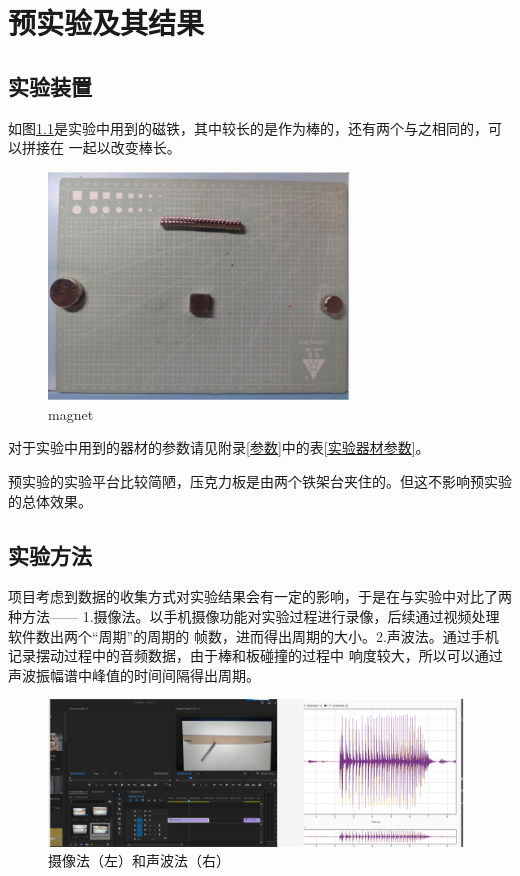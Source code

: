\documentclass[AutoFakeBold]{LZUThesis}
\begin{document}
\chapter{预实验及其结果}
\section{实验装置}
如图\ref{magnet}是实验中用到的磁铁，其中较长的是作为棒的，还有两个与之相同的，可以拼接在
一起以改变棒长。
\begin{figure}[H]
    \centering
    \includegraphics[width=8cm]{figures/magnet.png}
    \caption{magnet}
    \label{magnet}
\end{figure}

对于实验中用到的器材的参数请见附录\ref{参数}中的表\ref{实验器材参数}。

预实验的实验平台比较简陋，压克力板是由两个铁架台夹住的。但这不影响预实验的总体效果。

\section{实验方法}
项目考虑到数据的收集方式对实验结果会有一定的影响，于是在与实验中对比了两种方法——
1.摄像法。以手机摄像功能对实验过程进行录像，后续通过视频处理软件数出两个“周期”的周期的
帧数，进而得出周期的大小。2.声波法。通过手机记录摆动过程中的音频数据，由于棒和板碰撞的过程中
响度较大，所以可以通过声波振幅谱中峰值的时间间隔得出周期。
\begin{figure}[H]
    \centering
    \includegraphics[width=11cm]{figures/ways.png}
    \caption{摄像法（左）和声波法（右）}
    \label{ways}
\end{figure}
\end{document}
